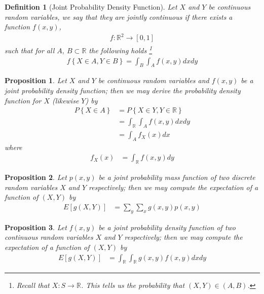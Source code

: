 \documentclass[11pt, oneside]{book}   	%
\newtheorem{definition}{Definition}[chapter]
\newtheorem{proposition}{Proposition}[chapter]
\newcommand{\set}[1]{\left\{#1\right\}}
\begin{document}
\begin{spacing}{1.618}
\begin{definition}[Joint Probability Density Function]
	Let $X$ and $Y$ be continuous random variables, we say that they are \emph{jointly continuous} if there exists a function $f(x, y)$,
	\begin{alignat}{4}
		f:\mathbb{R}^2\to [0,1]
	\end{alignat}
	such that for all $A,~B\subset \mathbb{R}$ the following holds \footnote{Recall that $X:S\to \mathbb{R}$. This tells us the probability that $(X, Y)\in (A, B)$.}
	\begin{alignat}{4}
		f\set{X\in A, Y\in B}=\int_B\int_Af(x, y)dx dy
	\end{alignat}
\end{definition}
\end{spacing}

\begin{proposition}
	Let $X$ and $Y$ be continuous random variables and $f(x, y)$ be a joint probability density function; then we may derive the probability density function for $X$ (likewise $Y$) by 
	\begin{alignat*}{4}
		P\set{X\in A}&=P\set{X\in Y, Y\in \mathbb{R}} \\
			&=\int_\mathbb{R}\int_Af(x, y)dx dy \\
			&=\int_A f_X(x)dx 
	\end{alignat*}
	where
	\begin{alignat}{4}
		f_X(x)&=\int_\mathbb{R}f(x, y)dy
	\end{alignat}
\end{proposition}

\begin{proposition}
	Let $p(x, y)$ be a joint probability mass function of two discrete random variables $X$ and $Y$ respectively; then we may compute the expectation of a function of $(X, Y)$ by 
	\begin{alignat}{4}
		E[g(X, Y)]&=\sum_y\sum_xg(x, y)p(x, y)
	\end{alignat}
\end{proposition}

\begin{proposition}
	Let $f(x, y)$ be a joint probability density function of two continuous random variables $X$ and $Y$ respectively; then we may compute the expectation of a function of $(X, Y)$ by 
	\begin{alignat}{4}
		E[g(X, Y)]&=\int_\mathbb{R}\int_\mathbb{R}g(x, y)f(x, y)dx dy
	\end{alignat}
\end{proposition}
\end{document}
